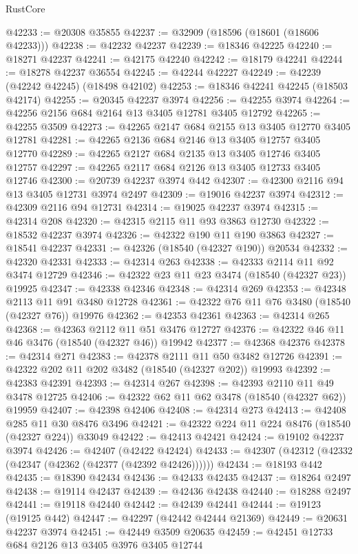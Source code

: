 \begin{lexlean}{RustCore}
\begin{coremodule}
@42233 := @20308 @35855
@42237 := @32909 (@18596 (@18601 (@18606 @42233)))
@42238 := @42232 @42237
@42239 := @18346 @42225
@42240 := @18271 @42237
@42241 := @42175 @42240
@42242 := @18179 @42241
@42244 := @18278 @42237 @36554
@42245 := @42244 @42227
@42249 := @42239 (@42242 @42245) (@18498 @42102)
@42253 := @18346 @42241 @42245 (@18503 @42174)
@42255 := @20345 @42237 @3974
@42256 := @42255 @3974
@42264 := @42256 @2156 @684 @2164 @13 @3405 @12781 @3405 @12792
@42265 := @42255 @3509
@42273 := @42265 @2147 @684 @2155 @13 @3405 @12770 @3405 @12781
@42281 := @42265 @2136 @684 @2146 @13 @3405 @12757 @3405 @12770
@42289 := @42265 @2127 @684 @2135 @13 @3405 @12746 @3405 @12757
@42297 := @42265 @2117 @684 @2126 @13 @3405 @12733 @3405 @12746
@42300 := @20739 @42237 @3974 @442
@42307 := @42300 @2116 @94 @13 @3405 @12731 @3974 @2497
@42309 := @19016 @42237 @3974
@42312 := @42309 @2116 @94 @12731
@42314 := @19025 @42237 @3974
@42315 := @42314 @208
@42320 := @42315 @2115 @11 @93 @3863 @12730
@42322 := @18532 @42237 @3974
@42326 := @42322 @190 @11 @190 @3863
@42327 := @18541 @42237
@42331 := @42326 (@18540 (@42327 @190)) @20534
@42332 := @42320 @42331
@42333 := @42314 @263
@42338 := @42333 @2114 @11 @92 @3474 @12729
@42346 := @42322 @23 @11 @23 @3474 (@18540 (@42327 @23)) @19925
@42347 := @42338 @42346
@42348 := @42314 @269
@42353 := @42348 @2113 @11 @91 @3480 @12728
@42361 := @42322 @76 @11 @76 @3480 (@18540 (@42327 @76)) @19976
@42362 := @42353 @42361
@42363 := @42314 @265
@42368 := @42363 @2112 @11 @51 @3476 @12727
@42376 := @42322 @46 @11 @46 @3476 (@18540 (@42327 @46)) @19942
@42377 := @42368 @42376
@42378 := @42314 @271
@42383 := @42378 @2111 @11 @50 @3482 @12726
@42391 := @42322 @202 @11 @202 @3482 (@18540 (@42327 @202)) @19993
@42392 := @42383 @42391
@42393 := @42314 @267
@42398 := @42393 @2110 @11 @49 @3478 @12725
@42406 := @42322 @62 @11 @62 @3478 (@18540 (@42327 @62)) @19959
@42407 := @42398 @42406
@42408 := @42314 @273
@42413 := @42408 @285 @11 @30 @8476 @3496
@42421 := @42322 @224 @11 @224 @8476 (@18540 (@42327 @224)) @33049
@42422 := @42413 @42421
@42424 := @19102 @42237 @3974
@42426 := @42407 (@42422 @42424)
@42433 := @42307 (@42312 (@42332 (@42347 (@42362 (@42377 (@42392 @42426))))))
@42434 := @18193 @442
@42435 := @18390 @42434
@42436 := @42433 @42435
@42437 := @18264 @2497
@42438 := @19114 @42437
@42439 := @42436 @42438
@42440 := @18288 @2497
@42441 := @19118 @42440
@42442 := @42439 @42441
@42444 := @19123 (@19125 @442)
@42447 := @42297 (@42442 @42444 @21369)
@42449 := @20631 @42237 @3974
@42451 := @42449 @3509 @20635
@42459 := @42451 @12733 @684 @2126 @13 @3405 @3976 @3405 @12744

\end{coremodule}
\end{lexlean}
